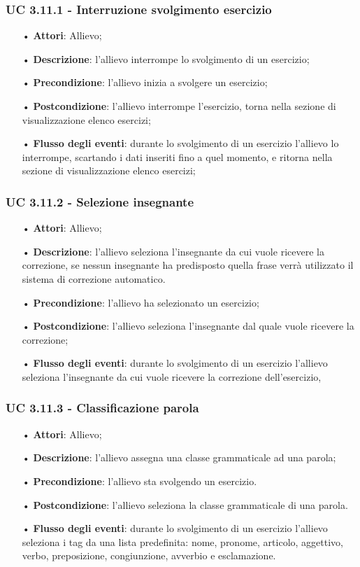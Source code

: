 \subsubsection{UC 3.11.1 - Interruzione svolgimento esercizio}
\begin{itemize}
	\item[•]\textbf{Attori}: Allievo;
	\item[•]\textbf{Descrizione}: l'allievo interrompe lo svolgimento di un esercizio;
	\item[•]\textbf{Precondizione}: l'allievo inizia a svolgere un esercizio;
	\item[•]\textbf{Postcondizione}: l'allievo interrompe l'esercizio, torna nella sezione di visualizzazione elenco esercizi;
	\item[•]\textbf{Flusso degli eventi}: durante lo svolgimento di un esercizio l'allievo lo interrompe, scartando i dati inseriti fino a quel momento, e ritorna nella sezione di visualizzazione elenco esercizi;
\end{itemize}

\subsubsection{UC 3.11.2 - Selezione insegnante}
\begin{itemize}
	\item[•]\textbf{Attori}: Allievo;
	\item[•]\textbf{Descrizione}: l'allievo seleziona l'insegnante da cui vuole ricevere la correzione, se nessun insegnante ha predisposto quella frase verrà utilizzato il sistema di correzione automatico.
	\item[•]\textbf{Precondizione}: l'allievo ha selezionato un esercizio;
	\item[•]\textbf{Postcondizione}: l'allievo seleziona l'insegnante dal quale vuole ricevere la correzione;
	\item[•]\textbf{Flusso degli eventi}: durante lo svolgimento di un esercizio  l'allievo seleziona l'insegnante da cui vuole ricevere la correzione dell'esercizio, 
\end{itemize}

\subsubsection{UC 3.11.3 - Classificazione parola}
\begin{itemize}
	\item[•]\textbf{Attori}: Allievo;
	\item[•]\textbf{Descrizione}: l'allievo assegna una classe grammaticale ad una parola;
		\item[•]\textbf{Precondizione}: l'allievo sta svolgendo un esercizio.
	\item[•]\textbf{Postcondizione}: l'allievo seleziona la classe grammaticale di una parola.
	\item[•]\textbf{Flusso degli eventi}: durante lo svolgimento di un esercizio  l'allievo seleziona i tag da una lista predefinita: nome, pronome, articolo, aggettivo, verbo, preposizione, congiunzione, avverbio e esclamazione.
\end{itemize}


